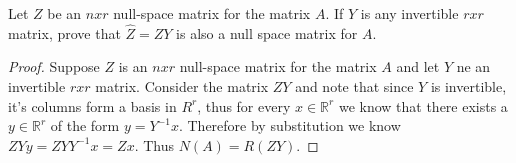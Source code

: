 \documentclass[12pt]{article}
\makeatletter
\theoremstyle{homework}
\newenvironment{exercise}[1]
{\def\@currentlabel{#1}\exercisecore}
{\endexercisecore}
\newcommand{\Reals}{\ensuremath{\mathbb R}}
\let\RR\Reals
\makeatother
\begin{document}
\begin{exercise}{2.2} Let $Z$ be an $n x r$ null-space matrix for the matrix $A$. If $Y$ 
  is any invertible $rxr$ matrix, prove that $\hat{Z} = ZY$ is also a null space matrix for $A$.
  \begin{proof} Suppose $Z$ is an $n x r$ null-space matrix for the matrix $A$ and let $Y$ ne 
    an invertible $r x r$ matrix. Consider the matrix $ZY$ and note that since $Y$ is invertible, it's columns 
    form a basis in $R^r$, thus for every $x \in \RR^r$ we know that there exists a $y \in \RR^r$ of the form 
    $y = Y^{-1}x$. Therefore by substitution we know $ZYy = ZYY^{-1}x = Zx$. Thus $N(A) = R(ZY)$. 
 \end{proof}
\end{exercise}
\vspace{.5in}
\end{document}
